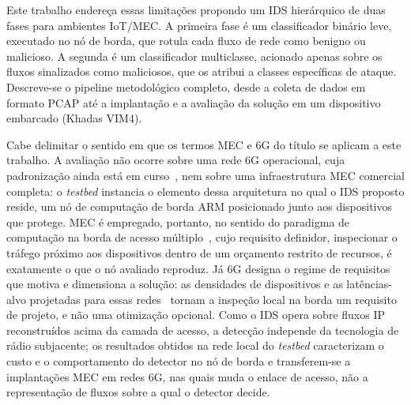 \documentclass[12pt]{article}
\begin{document}
Este trabalho endereça essas limitações propondo um IDS
hierárquico de duas fases para ambientes IoT/MEC. A primeira fase é um
classificador binário leve, executado no nó de borda, que rotula cada fluxo de
rede como benigno ou malicioso. A segunda é um classificador multiclasse,
acionado apenas sobre os fluxos sinalizados como maliciosos, que os atribui a
classes específicas de ataque. Descreve-se o pipeline metodológico completo,
desde a coleta de dados em formato PCAP até a implantação e a avaliação da
solução em um dispositivo embarcado (Khadas VIM4).

Cabe delimitar o sentido em que os termos MEC e 6G do título se aplicam a este
trabalho. A avaliação não ocorre sobre uma rede 6G operacional, cuja
padronização ainda está em curso~\cite{you:21}, nem sobre uma infraestrutura
MEC comercial completa: o \textit{testbed} instancia o elemento dessa
arquitetura no qual o IDS proposto reside, um nó de computação de borda ARM
posicionado junto aos dispositivos que protege. MEC é empregado, portanto, no
sentido do paradigma de computação na borda de acesso
múltiplo~\cite{gyamfi:22}, cujo requisito definidor, inspecionar o tráfego
próximo aos dispositivos dentro de um orçamento restrito de recursos, é
exatamente o que o nó avaliado reproduz. Já 6G designa o regime de requisitos
que motiva e dimensiona a solução: as densidades de dispositivos e as
latências-alvo projetadas para essas redes~\cite{you:21} tornam a inspeção
local na borda um requisito de projeto, e não uma otimização opcional. Como o
IDS opera sobre fluxos IP reconstruídos acima da camada de acesso, a detecção
independe da tecnologia de rádio subjacente; os resultados obtidos na rede
local do \textit{testbed} caracterizam o custo e o comportamento do detector no
nó de borda e transferem-se a implantações MEC em redes 6G, nas quais muda o
enlace de acesso, não a representação de fluxos sobre a qual o detector decide.
\end{document}
